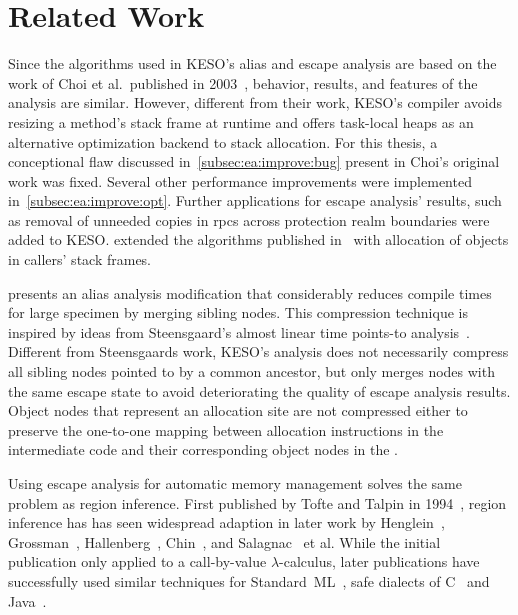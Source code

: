 
\chapter{Related Work}
	\label{chapter:rel}
	Since the algorithms used in KESO's alias and escape analysis are based on the work of Choi et al.\ published in
	2003~\cite{choi:03:toplas}, behavior, results, and features of the analysis are similar. However, different from their
	work, KESO's compiler avoids resizing a method's stack frame at runtime and offers task-local heaps as an alternative
	optimization backend to stack allocation. For this thesis, a conceptional flaw discussed
	in~\cref{subsec:ea:improve:bug} present in Choi's original work was fixed. Several other performance improvements were
	implemented in~\cref{subsec:ea:improve:opt}. Further applications for escape analysis' results, such as removal of
	unneeded copies in \glspl{rpc} across protection realm boundaries were added to KESO.  extended the
	algorithms published in~\cite{choi:03:toplas} with allocation of objects in callers' stack frames.

	 presents an alias analysis modification that considerably reduces compile
	times for large specimen by merging sibling nodes. This compression technique is inspired by ideas from Steensgaard's
	almost linear time points-to analysis~\cite{steensgaard:96:popl}. Different from Steensgaards work, KESO's analysis
	does not necessarily compress all sibling nodes pointed to by a common ancestor, but only merges nodes with the same
	escape state to avoid deteriorating the quality of escape analysis results. Object nodes that represent an allocation
	site are not compressed either to preserve the one-to-one mapping between allocation instructions in the intermediate
	code and their corresponding object nodes in the .

	Using escape analysis for automatic memory management solves the same problem as region inference. First published by
	Tofte and Talpin in 1994~\cite{tofte:94:popl}, region inference has has seen widespread adaption in later work by
	Henglein~\cite{henglein:01:ppdp}, Grossman~\cite{grossman:02:pldi}, Hallenberg~\cite{hallenberg:02:sigplan},
	Chin~\cite{chin:04:pldi}, and Salagnac~\cite{salagnac:05:aiool, salagnac:07:rtcsa} et al. While the initial
	publication only applied to a call-by-value $\lambda$-calculus, later publications have successfully used similar
	techniques for Standard~ML~\cite{henglein:01:ppdp, hallenberg:02:sigplan}, safe dialects of C~\cite{grossman:02:pldi}
	and Java~\cite{chin:04:pldi, salagnac:05:aiool, salagnac:07:rtcsa}.

